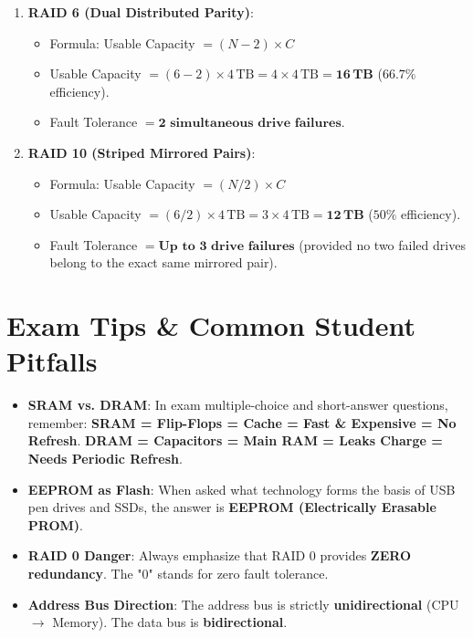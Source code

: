 \begin{example}
\begin{solutionbox}
\begin{enumerate}[label=(\alph*)]
    \item \textbf{RAID 6 (Dual Distributed Parity)}:
    \begin{itemize}
        \item Formula: Usable Capacity $= (N - 2) \times C$
        \item Usable Capacity $= (6 - 2) \times 4\,\text{TB} = 4 \times 4\,\text{TB} = \mathbf{16\,\text{TB}}$ ($66.7\%$ efficiency).
        \item Fault Tolerance $= \mathbf{2\text{ simultaneous drive failures}}$.
    \end{itemize}

    \item \textbf{RAID 10 (Striped Mirrored Pairs)}:
    \begin{itemize}
        \item Formula: Usable Capacity $= (N / 2) \times C$
        \item Usable Capacity $= (6 / 2) \times 4\,\text{TB} = 3 \times 4\,\text{TB} = \mathbf{12\,\text{TB}}$ ($50\%$ efficiency).
        \item Fault Tolerance $= \mathbf{\text{Up to } 3\text{ drive failures}}$ (provided no two failed drives belong to the exact same mirrored pair).
    \end{itemize}
\end{enumerate}
\end{solutionbox}
\end{example}

\section{Exam Tips \& Common Student Pitfalls}

\begin{examtip}
\begin{itemize}
    \item \textbf{SRAM vs. DRAM}: In exam multiple-choice and short-answer questions, remember: \textbf{SRAM = Flip-Flops = Cache = Fast \& Expensive = No Refresh}. \textbf{DRAM = Capacitors = Main RAM = Leaks Charge = Needs Periodic Refresh}.
    \item \textbf{EEPROM as Flash}: When asked what technology forms the basis of USB pen drives and SSDs, the answer is \textbf{EEPROM (Electrically Erasable PROM)}.
    \item \textbf{RAID 0 Danger}: Always emphasize that RAID 0 provides \textbf{ZERO redundancy}. The "0" stands for zero fault tolerance.
    \item \textbf{Address Bus Direction}: The address bus is strictly \textbf{unidirectional} (CPU $\rightarrow$ Memory). The data bus is \textbf{bidirectional}.
\end{itemize}
\end{examtip}


